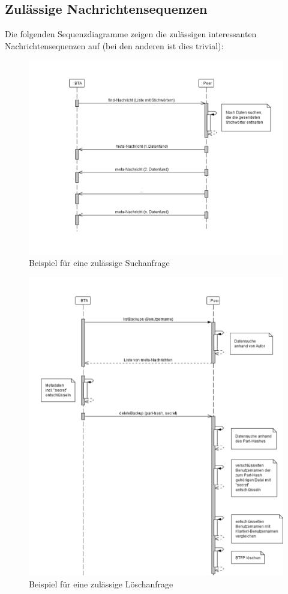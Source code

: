 \newpage

\subsection{Zulässige Nachrichtensequenzen}
Die folgenden Sequenzdiagramme zeigen die zulässigen interessanten Nachrichtensequenzen auf (bei den anderen ist dies trivial):
\begin{figure}[hpt]
	\includegraphics[width=\linewidth]{find.pdf}
	\caption{Beispiel für eine zulässige Suchanfrage}
\end{figure}

\begin{figure}[hpt]
	\includegraphics[width=\linewidth]{deleteBackup.pdf}
	\caption{Beispiel für eine zulässige Löschanfrage}
\end{figure}
